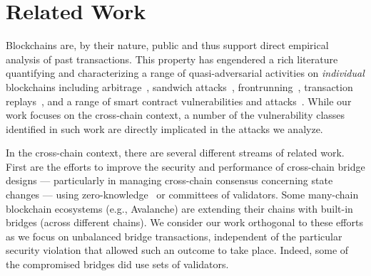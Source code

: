 \section{Related Work}


Blockchains are, by their nature, public and thus support direct
empirical analysis of past transactions.  This property has engendered a rich
literature quantifying and characterizing a range of quasi-adversarial
activities on \emph{individual} blockchains including
arbitrage~\cite{mclaughlin2023large, qin2022quantifying}, sandwich
attacks~\cite{qin2022quantifying, zhou2021high},
frontrunning~\cite{daian2020flash}, transaction
replays~\cite{qin2022quantifying}, and a range of smart contract
vulnerabilities and attacks~\cite{perez2021smart,grossman2017online,
  rodler2018sereum, zhang2020txspector, wu2021defiranger,
  ferreira2021eye}.  While our work focuses on the cross-chain
context, a number of the vulnerability classes
identified in such work are directly implicated in the attacks we analyze.%





In the cross-chain context, there are several different streams of
related work.  First are the efforts to improve the security and
performance of cross-chain bridge designs --- particularly in managing
cross-chain consensus concerning state changes --- using
zero-knowledge~\cite{xie2022zkbridge} or committees of
validators\cite{lan2021horizon,li2022polybridge}.
Some many-chain blockchain ecosystems (e.g., Avalanche) are extending
their chains with built-in bridges (across different chains). We consider our
work orthogonal to these efforts as we focus on unbalanced bridge transactions, independent of the particular
security violation that allowed such an outcome to take place.
Indeed, some of the compromised bridges did use sets of validators.

